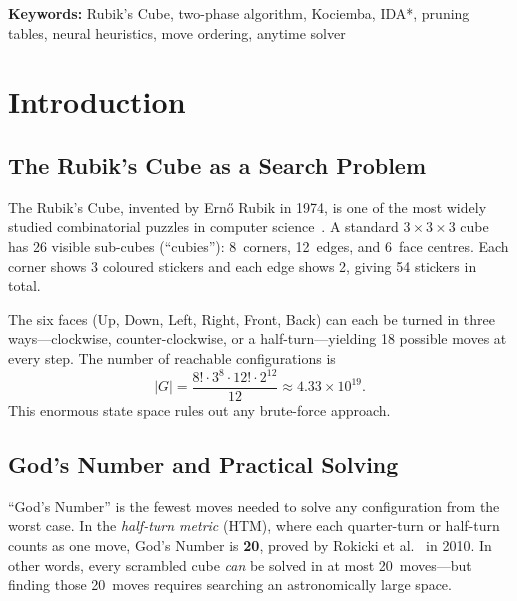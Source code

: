 \documentclass[graybox]{svmult}
\begin{document}

\textbf{Keywords:} Rubik’s Cube, two-phase algorithm, Kociemba, IDA*, pruning tables, neural heuristics, move ordering, anytime solver

\section{Introduction}
\label{sec:intro}
\subsection{The Rubik's Cube as a Search Problem}
The Rubik's Cube, invented by Ern\H{o} Rubik in 1974, is one of the most widely studied combinatorial puzzles in computer science~\cite{joyner2008}. A standard $3{\times}3{\times}3$ cube has 26 visible sub-cubes (``cubies''): 8~corners, 12~edges, and 6~face centres. Each corner shows 3 coloured stickers and each edge shows 2, giving 54 stickers in total.

The six faces (Up, Down, Left, Right, Front, Back) can each be turned in three ways---clockwise, counter-clockwise, or a half-turn---yielding 18 possible moves at every step. The number of reachable configurations is
\begin{equation}
|G| = \frac{8! \cdot 3^8 \cdot 12! \cdot 2^{12}}{12} \approx 4.33 \times 10^{19}.
\end{equation}
This enormous state space rules out any brute-force approach.

\subsection{God's Number and Practical Solving}
``God's Number'' is the fewest moves needed to solve any configuration from the worst case. In the \emph{half-turn metric} (HTM), where each quarter-turn or half-turn counts as one move, God's Number is \textbf{20}, proved by Rokicki et al.~\cite{godnumber} in 2010. In other words, every scrambled cube \emph{can} be solved in at most 20~moves---but finding those 20~moves requires searching an astronomically large space.
\end{document}
